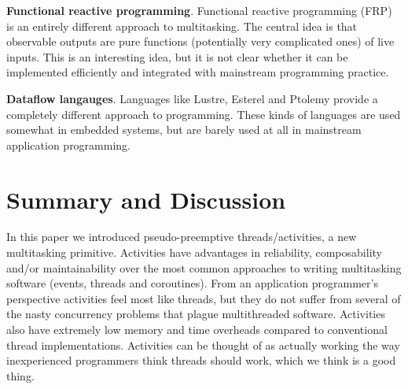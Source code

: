 \documentclass[9pt,preprint]{sigplanconf-2}
\begin{document}
\textbf{Functional reactive programming}.
Functional reactive programming (FRP) is an entirely different approach to multitasking.
The central idea is that observable outputs are pure functions (potentially very complicated ones) of live inputs.
This is an interesting idea, but it is not clear whether it can be implemented efficiently and integrated with mainstream programming practice.

\textbf{Dataflow langauges}.
Languages like Lustre, Esterel and Ptolemy provide a completely different approach to programming.
These kinds of languages are used somewhat in embedded systems, but are barely used at all in mainstream application programming.

\section{Summary and Discussion}

In this paper we introduced pseudo-preemptive threads/activities, a new multitasking primitive.
Activities have advantages in reliability, composability and/or maintainability over the most common approaches to writing multitasking software (events, threads and coroutines).
From an application programmer's perspective activities feel most like threads, but they do not suffer from several of the nasty concurrency problems that plague multithreaded software.
Activities also have extremely low memory and time overheads compared to conventional thread implementations.
Activities can be thought of as actually working the way inexperienced programmers think threads should work, which we think is a good thing.










\end{document}
